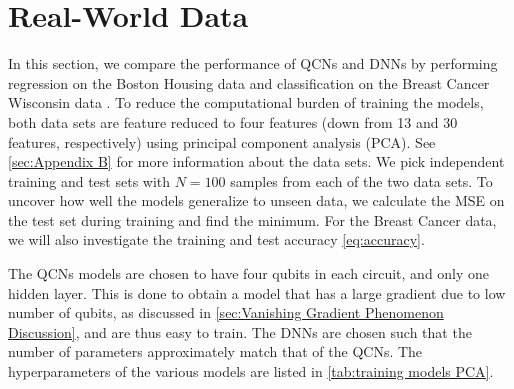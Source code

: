 \section{Real-World Data}\label{sec:Real Data}
In this section, we compare the performance of QCNs and DNNs by performing regression on the Boston Housing data \cite{boston} and classification on the Breast Cancer Wisconsin data \cite{cancer}. To reduce the computational burden of training the models, both data sets are feature reduced to four features (down from 13 and 30 features, respectively) using principal component analysis (PCA). See \cref{sec:Appendix B} for more information about the data sets. We pick independent training and test sets with $N=100$ samples from each of the two data sets. To uncover how well the models generalize to unseen data, we calculate the MSE on the test set during training and find the minimum. For the Breast Cancer data, we will also investigate the training and test accuracy \cref{eq:accuracy}. 

The QCNs models are chosen to have four qubits in each circuit, and only one hidden layer. This is done to obtain a model that has a large gradient due to low number of qubits, as discussed in \cref{sec:Vanishing Gradient Phenomenon Discussion}, and are thus easy to train. The DNNs are chosen such that the number of parameters approximately match that of the QCNs. The hyperparameters of the various models are listed in \cref{tab:training models PCA}.





